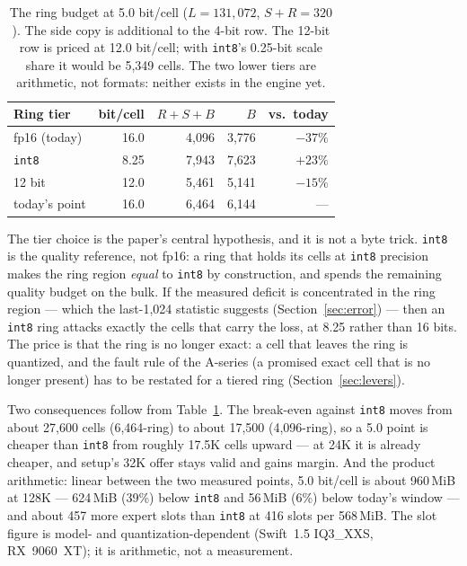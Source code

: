 \documentclass[10pt,twocolumn]{article}
\begin{document}
\begin{table}[t]
\centering
\footnotesize
\caption{The ring budget at 5.0 bit/cell ($L{=}131{,}072$, $S{+}R{=}320$). The side copy is additional to the 4-bit row. The 12-bit row is priced at 12.0 bit/cell; with \texttt{int8}'s 0.25-bit scale share it would be 5,349 cells. The two lower tiers are arithmetic, not formats: neither exists in the engine yet.}
\label{tab:tiers}
\begin{tabular}{@{}lrrrr@{}}
\toprule
Ring tier & bit/cell & $R{+}S{+}B$ & $B$ & vs.\ today \\
\midrule
fp16 (today) & 16.0 & 4,096 & 3,776 & $-37\%$ \\
\texttt{int8} & 8.25 & 7,943 & 7,623 & $+23\%$ \\
12 bit & 12.0 & 5,461 & 5,141 & $-15\%$ \\
\midrule
today's point & 16.0 & 6,464 & 6,144 & --- \\
\bottomrule
\end{tabular}
\end{table}

The tier choice is the paper's central hypothesis, and it is not a byte trick. \texttt{int8} is the quality reference, not fp16: a ring that holds its cells at \texttt{int8} precision makes the ring region \emph{equal} to \texttt{int8} by construction, and spends the remaining quality budget on the bulk. If the measured deficit is concentrated in the ring region --- which the last-1,024 statistic suggests (Section~\ref{sec:error}) --- then an \texttt{int8} ring attacks exactly the cells that carry the loss, at 8.25 rather than 16 bits. The price is that the ring is no longer exact: a cell that leaves the ring is quantized, and the fault rule of the A-series (a promised exact cell that is no longer present) has to be restated for a tiered ring (Section~\ref{sec:levers}).

Two consequences follow from Table~\ref{tab:tiers}. The break-even against \texttt{int8} moves from about 27,600 cells (6,464-ring) to about 17,500 (4,096-ring), so a 5.0 point is cheaper than \texttt{int8} from roughly 17.5K cells upward --- at 24K it is already cheaper, and setup's 32K offer stays valid and gains margin. And the product arithmetic: linear between the two measured points, 5.0 bit/cell is about 960\,MiB at 128K --- 624\,MiB (39\%) below \texttt{int8} and 56\,MiB (6\%) below today's window --- and about 457 more expert slots than \texttt{int8} at 416 slots per 568\,MiB. The slot figure is model- and quantization-dependent (Swift~1.5 IQ3\_XXS, RX~9060~XT); it is arithmetic, not a measurement.
\end{document}
